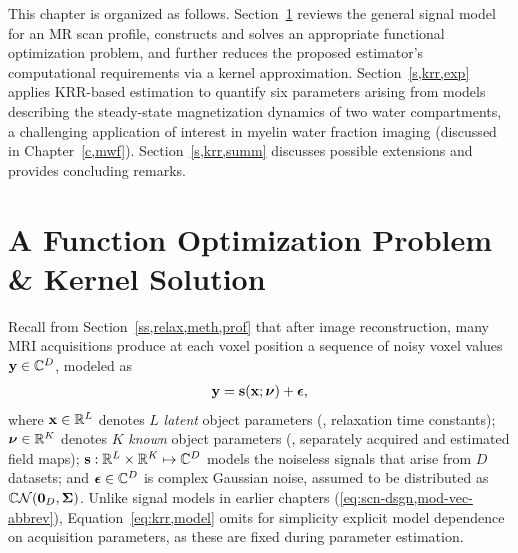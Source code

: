 This chapter is organized as follows.
Section~\ref{s,krr,meth}
reviews the general signal model
for an MR scan profile,
constructs and solves 
an appropriate functional optimization problem,
and further reduces the proposed estimator's
computational requirements
via a kernel approximation.
Section~\ref{s,krr,exp}
applies KRR-based estimation
to quantify six parameters arising 
from models describing the steady-state 
magnetization dynamics
of two water compartments,
a challenging application
of interest in myelin water fraction imaging 
(discussed in Chapter~\ref{c,mwf}).
Section~\ref{s,krr,summ}
discusses possible extensions 
and provides concluding remarks.

\section{A Function Optimization Problem \& Kernel Solution}
\label{s,krr,meth}


Recall from Section~\ref{ss,relax,meth,prof}
that after image reconstruction,
many MRI acquisitions
produce at each voxel position
a sequence of noisy voxel values 
$\mathbf{y} \in \mathbb{C}^{D}$, 
modeled as
\begin{align}
	\bmy = \bms\paren{\bmx; \bmnu} + \bmeps,
	\label{eq:krr,model}
\end{align}
where $\mathbf{x} \in \mathbb{R}^{L}$ denotes $L$ \emph{latent} object parameters 
(\eg, relaxation time constants);
$\boldsymbol{\nu} \in \mathbb{R}^{K}$ denotes $K$ \emph{known} object parameters 
(\eg, separately acquired and estimated field maps);
$\mathbf{s} : \mathbb{R}^{L} \times \mathbb{R}^{K} \mapsto \mathbb{C}^{D}$ 
models the noiseless signals that arise from $D$ datasets;
and $\boldsymbol{\epsilon} \in \mathbb{C}^{D}$
is complex Gaussian noise,
assumed to be distributed as $\cgauss{\zeros{D}}{\bmSig}$.
Unlike signal models in earlier chapters
(\cf \eqref{eq:scn-dsgn,mod-vec-abbrev}),
Equation~\ref{eq:krr,model} omits
for simplicity
explicit model dependence on acquisition parameters,
as these are fixed 
during parameter estimation.

